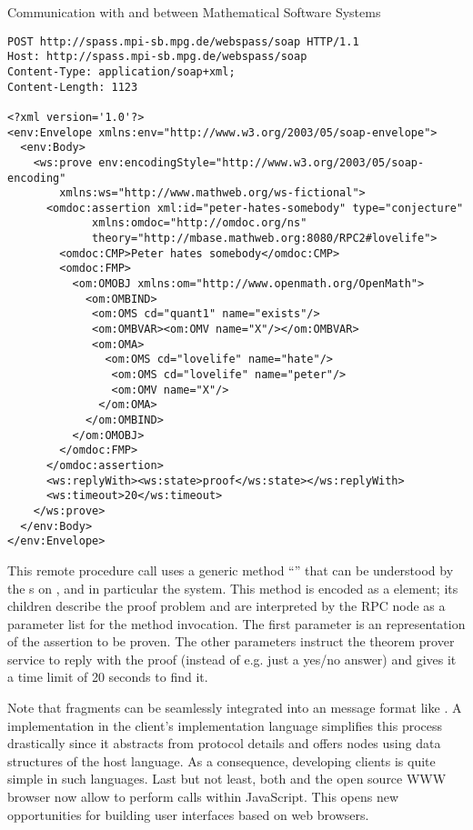 \begin{tchapter}[id=rpc,short=Communication between Systems]{Communication with and between Mathematical Software Systems}
\begin{lstlisting}[label=lst:rpc-prover,
  caption={A {\soap} RPC call to {\spass}}]
POST http://spass.mpi-sb.mpg.de/webspass/soap HTTP/1.1
Host: http://spass.mpi-sb.mpg.de/webspass/soap
Content-Type: application/soap+xml; 
Content-Length: 1123

<?xml version='1.0'?>
<env:Envelope xmlns:env="http://www.w3.org/2003/05/soap-envelope">
  <env:Body>
    <ws:prove env:encodingStyle="http://www.w3.org/2003/05/soap-encoding"
        xmlns:ws="http://www.mathweb.org/ws-fictional">
      <omdoc:assertion xml:id="peter-hates-somebody" type="conjecture"
             xmlns:omdoc="http://omdoc.org/ns"
             theory="http://mbase.mathweb.org:8080/RPC2#lovelife"> 
        <omdoc:CMP>Peter hates somebody</omdoc:CMP> 
        <omdoc:FMP> 
          <om:OMOBJ xmlns:om="http://www.openmath.org/OpenMath"> 
            <om:OMBIND> 
             <om:OMS cd="quant1" name="exists"/> 
             <om:OMBVAR><om:OMV name="X"/></om:OMBVAR> 
             <om:OMA> 
               <om:OMS cd="lovelife" name="hate"/> 
                <om:OMS cd="lovelife" name="peter"/> 
                <om:OMV name="X"/> 
              </om:OMA> 
            </om:OMBIND> 
          </om:OMOBJ> 
        </omdoc:FMP> 
      </omdoc:assertion> 
      <ws:replyWith><ws:state>proof</ws:state></ws:replyWith>
      <ws:timeout>20</ws:timeout>
    </ws:prove>
  </env:Body>
</env:Envelope>
\end{lstlisting}
This {\soap} remote procedure call uses a generic method ``{}'' that can be
understood by the {s} on {\mathwebsb}, and in
particular the {\spass} system. This method is encoded as a {}
element; its children describe the proof problem and are interpreted by the {\soap} RPC
node as a parameter list for the method invocation.  The first parameter is an {\omdoc}
representation of the assertion to be proven. The other parameters instruct the theorem
prover service to reply with the proof (instead of e.g. just a yes/no answer) and gives it
a time limit of 20 seconds to find it.

Note that {\omdoc} fragments can be seamlessly integrated into an {\xml} message format
like {\soap}. A {\soap} implementation in the client's implementation language simplifies
this process drastically since it abstracts from {\http} protocol details and offers
{\soap} nodes using data structures of the host language.  As a consequence, developing
{\mathweb} clients is quite simple in such languages.  Last but not least, both {\msie}
and the open source WWW browser {\firefox} now allow to perform {\soap} calls within
JavaScript. This opens new opportunities for building user interfaces based on web
browsers.


\end{tchapter}
